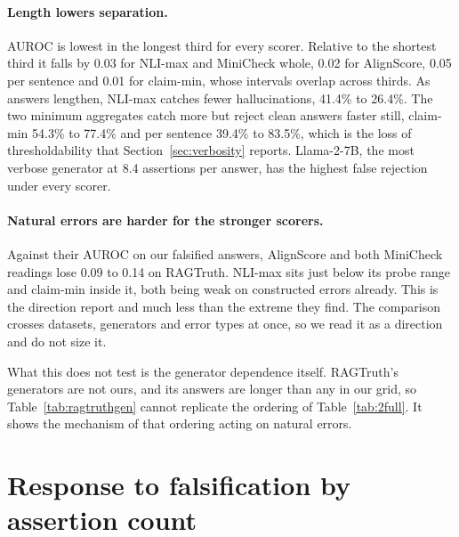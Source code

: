 \documentclass[11pt]{article}
\begin{document}
\paragraph{Length lowers separation.} AUROC is lowest in the longest third for every scorer. Relative to the shortest third it falls by 0.03 for NLI-max and MiniCheck whole, 0.02 for AlignScore, 0.05 per sentence and 0.01 for claim-min, whose intervals overlap across thirds. As answers lengthen, NLI-max catches fewer hallucinations, 41.4\% to 26.4\%. The two minimum aggregates catch more but reject clean answers faster still, claim-min 54.3\% to 77.4\% and per sentence 39.4\% to 83.5\%, which is the loss of thresholdability that Section~\ref{sec:verbosity} reports. Llama-2-7B, the most verbose generator at 8.4 assertions per answer, has the highest false rejection under every scorer.

\paragraph{Natural errors are harder for the stronger scorers.} Against their AUROC on our falsified answers, AlignScore and both MiniCheck readings lose 0.09 to 0.14 on RAGTruth. NLI-max sits just below its probe range and claim-min inside it, both being weak on constructed errors already. This is the direction \citet{sinha-2025} report and much less than the extreme they find. The comparison crosses datasets, generators and error types at once, so we read it as a direction and do not size it.

What this does not test is the generator dependence itself. RAGTruth's generators are not ours, and its answers are longer than any in our grid, so Table~\ref{tab:ragtruthgen} cannot replicate the ordering of Table~\ref{tab:2full}. It shows the mechanism of that ordering acting on natural errors.

\section{Response to falsification by assertion count}
\label{app:assertions}
\end{document}

